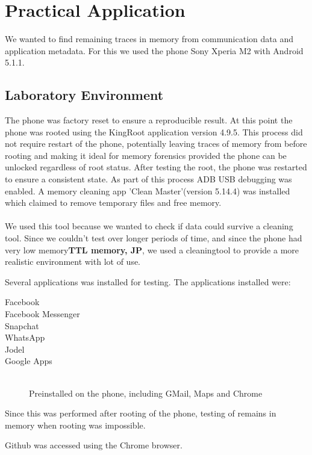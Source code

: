\section{Practical Application}
We wanted to find remaining traces in memory from communication data and application metadata. For this we used the phone Sony Xperia M2 with Android 5.1.1.

\subsection{Laboratory Environment}
The phone was factory reset to ensure a reproducible result. At this point the phone was rooted %
using the KingRoot application version 4.9.5. This process did not require restart of the phone, potentially leaving traces of memory from before rooting and making it ideal for memory forensics provided the phone can be unlocked regardless of root status. After testing the root, the phone was restarted to ensure a consistent state. As part of this process ADB USB debugging was enabled. A memory cleaning app 'Clean Master'(version 5.14.4) was installed which claimed to remove temporary files and free memory.\\\\ %

We used this tool because we wanted to check if data could survive a cleaning tool. Since we couldn't test over longer periods of time, and since the phone had very low memory\textbf{TTL memory, JP}, we used a cleaningtool to provide a more realistic environment with lot of use. 

Several applications was installed for testing. The applications installed were:
\begin{description}
\item[Facebook]
\item[Facebook Messenger]
\item[Snapchat]
\item[WhatsApp]
\item[Jodel]
\item[Google Apps] \hfill\\Preinstalled on the phone, including GMail, Maps and Chrome
\end{description}
Since this was performed after rooting of the phone, testing of remains in memory when rooting was impossible.

Github was accessed using the Chrome browser.
